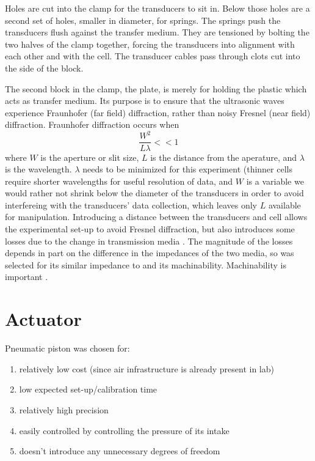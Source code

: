 Holes are cut into the clamp for the transducers to sit in. Below those holes are a second set of holes, smaller in diameter, for springs. The springs push the transducers flush against the transfer medium. They are tensioned by bolting the two halves of the clamp together, forcing the transducers into alignment with each other and with the cell. The transducer cables pass through clots cut into the side of the block.

The second block in the clamp, the plate, is merely for holding the plastic which acts as transfer medium. Its purpose is to ensure that the ultrasonic waves experience Fraunhofer (far field) diffraction, rather than noisy Fresnel (near field) diffraction. 
Fraunhofer diffraction occurs when
$$ \frac{W^2}{L\lambda} << 1$$
where $W$ is the aperture or slit size, $L$ is the distance from the aperature, and $\lambda$ is the wavelength.
$\lambda$ needs to be minimized for this experiment (thinner cells require shorter wavelengths for useful resolution of data, and $W$ is a variable we would rather not shrink below the diameter of the transducers in order to avoid interfereing with the transducers' data collection, which leaves only $L$ available for manipulation. Introducing a distance between the transducers and cell allows the experimental set-up to avoid Fresnel diffraction, but also introduces some losses due to the change in transmission media . The magnitude of the losses depends in part on the difference in the impedances of the two media, so  was selected for its similar impedance to  and its machinability. Machinability is important .
 
\section{Actuator}
Pneumatic piston was chosen for:
\begin{enumerate}
    \item relatively low cost (since air infrastructure is already present in lab)
    \item low expected set-up/calibration time
    \item relatively high precision
    \item easily controlled by controlling the pressure of its intake
    \item doesn't introduce any unnecessary degrees of freedom
\end{enumerate}

